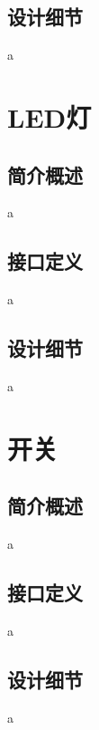     \subsection{设计细节}
    a

\section{LED灯}

    \subsection{简介概述}
    a

    \subsection{接口定义}
    a

    \subsection{设计细节}
    a

\section{开关}

    \subsection{简介概述}
    a

    \subsection{接口定义}
    a

    \subsection{设计细节}
    a



